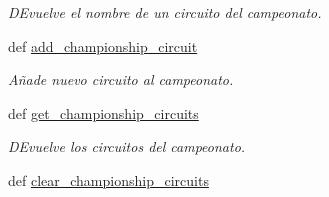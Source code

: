 \begin{DoxyCompactItemize}
\begin{DoxyCompactList}\small\item\em \-D\-Evuelve el nombre de un circuito del campeonato. \end{DoxyCompactList}\item 
def \hyperlink{classengine_1_1config_1_1Config_af4851816ff76f82221d53ade1dc729db}{add\-\_\-championship\-\_\-circuit}
\begin{DoxyCompactList}\small\item\em \-Añade nuevo circuito al campeonato. \end{DoxyCompactList}\item 
def \hyperlink{classengine_1_1config_1_1Config_adf7c2905dc0be33df822e2e2d5278782}{get\-\_\-championship\-\_\-circuits}
\begin{DoxyCompactList}\small\item\em \-D\-Evuelve los circuitos del campeonato. \end{DoxyCompactList}\item 
\hypertarget{classengine_1_1config_1_1Config_aaf7818464bc1eca62334eb79a757bce2}{
def \hyperlink{classengine_1_1config_1_1Config_aaf7818464bc1eca62334eb79a757bce2}{clear\-\_\-championship\-\_\-circuits}}
\label{classengine_1_1config_1_1Config_aaf7818464bc1eca62334eb79a757bce2}


\end{DoxyCompactItemize}
